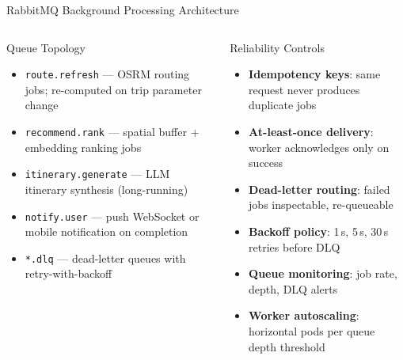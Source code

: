 \documentclass[aspectratio=169,professionalfonts]{beamer}
\newcommand{\hl}[1]{\textbf{\textcolor{ysblue}{#1}}}
\begin{document}
\begin{frame}{RabbitMQ Background Processing Architecture}
  \begin{columns}[T]
    \begin{block}{Queue Topology}
      \begin{itemize}
        \item \texttt{route.refresh} — OSRM routing jobs; re-computed on trip parameter change
        \item \texttt{recommend.rank} — spatial buffer + embedding ranking jobs
        \item \texttt{itinerary.generate} — LLM itinerary synthesis (long-running)
        \item \texttt{notify.user} — push WebSocket or mobile notification on completion
        \item \texttt{*.dlq} — dead-letter queues with retry-with-backoff
      \end{itemize}
    \end{block}

    \begin{block}{Reliability Controls}
      \begin{itemize}
        \item \hl{Idempotency keys}: same request never produces duplicate jobs
        \item \hl{At-least-once delivery}: worker acknowledges only on success
        \item \hl{Dead-letter routing}: failed jobs inspectable, re-queueable
        \item \hl{Backoff policy}: 1\,s, 5\,s, 30\,s retries before DLQ
        \item \hl{Queue monitoring}: job rate, depth, DLQ alerts
        \item \hl{Worker autoscaling}: horizontal pods per queue depth threshold
      \end{itemize}
    \end{block}
  \end{columns}
\end{frame}
\end{document}
